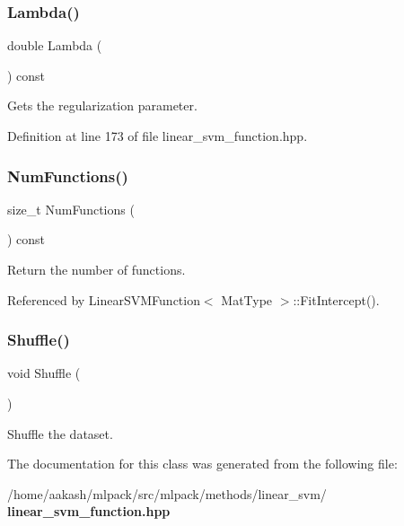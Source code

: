 \subsubsection{Lambda()\hspace{0.1cm}{\footnotesize\ttfamily [2/2]}}
{\footnotesize\ttfamily double Lambda (\begin{DoxyParamCaption}{ }\end{DoxyParamCaption}) const\hspace{0.3cm}{\ttfamily [inline]}}



Gets the regularization parameter. 



Definition at line 173 of file linear\+\_\+svm\+\_\+function.\+hpp.

\mbox{\label{classmlpack_1_1svm_1_1LinearSVMFunction_a1fa76af34a6e3ea927b307f0c318ee4b}} 
\subsubsection{Num\+Functions()}
{\footnotesize\ttfamily size\+\_\+t Num\+Functions (\begin{DoxyParamCaption}{ }\end{DoxyParamCaption}) const}



Return the number of functions. 



Referenced by Linear\+S\+V\+M\+Function$<$ Mat\+Type $>$\+::\+Fit\+Intercept().

\mbox{\label{classmlpack_1_1svm_1_1LinearSVMFunction_a2697cc8b37d7bca7c055228382a9b208}} 
\subsubsection{Shuffle()}
{\footnotesize\ttfamily void Shuffle (\begin{DoxyParamCaption}{ }\end{DoxyParamCaption})}



Shuffle the dataset. 



The documentation for this class was generated from the following file\+:\begin{DoxyCompactItemize}
\item 
/home/aakash/mlpack/src/mlpack/methods/linear\+\_\+svm/\textbf{ linear\+\_\+svm\+\_\+function.\+hpp}\end{DoxyCompactItemize}

